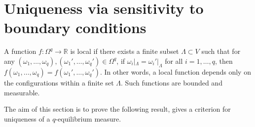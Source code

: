 \documentclass[11pt,reqno]{amsart}
\newtheorem{rk}{Remark}
\numberwithin{equation}{section} \setcounter{tocdepth}{1}
\begin{document}
%

\section{Uniqueness via sensitivity to boundary conditions}

 A function $ f : \Omega^q \to \mathbb{R} $ is local if there exists a finite subset $ \Lambda \subset V $ such that for any $ (\omega_1, \dots, \omega_q), (\omega_1', \dots, \omega_q') \in \Omega^q $, if $ \omega_i|_\Lambda = \omega_i'|_\Lambda $ for all $ i = 1, \dots, q $, then $ f(\omega_1, \dots, \omega_q) = f(\omega_1', \dots, \omega_q') $.
In other words, a local function depends only on the configurations within a finite set $ \Lambda $. Such functions are bounded and measurable.

The aim of this section is to prove the following result, gives a criterion for uniqueness of a $q$-equilibrium measure.
\end{document}
